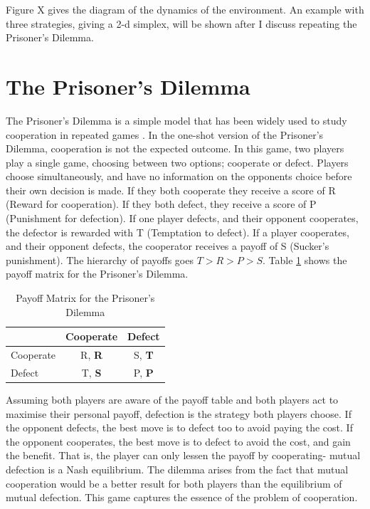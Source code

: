 \documentclass[a4paper,11pt,bcshonoursthesis,singlespace,twoside,thesisdraft,pdflatex]{cssethesis}
\begin{document}
Figure X gives the diagram of the dynamics of the environment. An example with three strategies, giving a 2-d simplex, will be shown after I discuss repeating the Prisoner's Dilemma.

\section{The Prisoner's Dilemma}
The Prisoner's Dilemma is a simple model that has been widely used to study cooperation in repeated games \citep{Axelrod1997}. 
In the one-shot version of the Prisoner's Dilemma, cooperation is not the expected outcome. 
In this game, two players play a single game, choosing between two options; cooperate or defect. 
Players choose simultaneously, and have no information on the opponents choice before their own decision is made. 
If they both cooperate they receive a score of R (Reward for cooperation). 
If they both defect, they receive a score of P (Punishment for defection). 
If one player defects, and their opponent cooperates, the defector is rewarded with T (Temptation to defect). 
If a player cooperates, and their opponent defects, the cooperator receives a payoff of S (Sucker's punishment). 
The hierarchy of payoffs goes $T>R>P>S$. Table \ref{table:payoffs} shows the payoff matrix for the Prisoner's Dilemma. 
\begin{table}[h]\centering
\captionsetup{justification=centering}
\begin{tabular}{|l|c|c|}
\hline
 & \bf{Cooperate} & \bf{Defect}\\
\hline
Cooperate & R, \bf{R} & S, \bf{T}\\
\hline
Defect & T, \bf{S}  & P, \bf{P} \\
\hline
\end{tabular}
\caption{Payoff Matrix for the Prisoner's Dilemma}
\label{table:payoffs}
\end{table}

Assuming both players are aware of the payoff table and both players act to maximise their personal payoff, defection is the strategy both players choose. 
If the opponent defects, the best move is to defect too to avoid paying the cost. 
If the opponent cooperates, the best move is to defect to avoid the cost, and gain the benefit. 
That is, the player can only lessen the payoff by cooperating- mutual defection is a Nash equilibrium. 
The dilemma arises from the fact that mutual cooperation would be a better result for both players than the equilibrium of mutual defection. 
This game captures the essence of the problem of cooperation.
\end{document}
